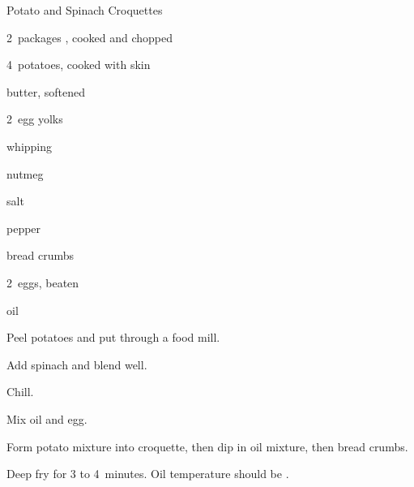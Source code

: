 \begin{recipe}{Potato and Spinach Croquettes}{}{}

\begin{ingredients}
\item 2~packages , cooked and chopped
\item 4~potatoes, cooked with skin
\item {} butter, softened
\item 2~egg yolks
\item {} whipping 
\item \tp{\half} nutmeg
\item salt
\item pepper
\item {} bread crumbs
\item 2~eggs, beaten
\item {} oil
\end{ingredients}

\begin{directions}
\item Peel potatoes and put through a food mill.
\item Add spinach and blend well.
\item Chill.
\item Mix oil and egg.
\item Form potato mixture into croquette, then dip in oil mixture, then bread crumbs.
\item Deep fry for 3 to 4~minutes. Oil temperature should be .
\end{directions}

\end{recipe}
